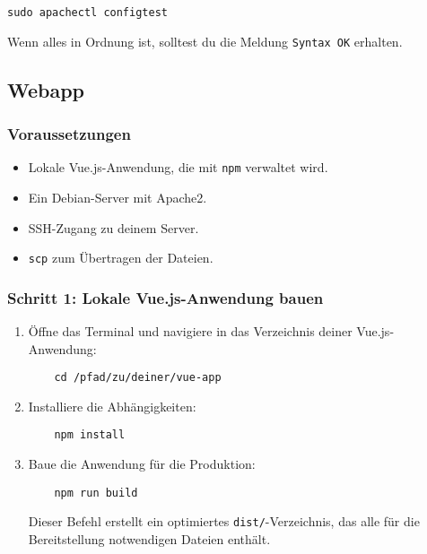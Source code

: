 \documentclass[a4paper,12pt]{article}
\begin{document}
\begin{lstlisting}
sudo apachectl configtest
\end{lstlisting}

Wenn alles in Ordnung ist, solltest du die Meldung \texttt{Syntax OK} erhalten.

\subsection{Webapp}

\subsubsection{Voraussetzungen}
\begin{itemize}
    \item Lokale Vue.js-Anwendung, die mit \texttt{npm} verwaltet wird.
    \item Ein Debian-Server mit Apache2.
    \item SSH-Zugang zu deinem Server.
    \item \texttt{scp} zum Übertragen der Dateien.
\end{itemize}

\subsubsection{Schritt 1: Lokale Vue.js-Anwendung bauen}
\begin{enumerate}
    \item Öffne das Terminal und navigiere in das Verzeichnis deiner Vue.js-Anwendung:
    
    \begin{lstlisting}
    cd /pfad/zu/deiner/vue-app
    \end{lstlisting}
    
    \item Installiere die Abhängigkeiten:

    \begin{lstlisting}
    npm install
    \end{lstlisting}
    
    \item Baue die Anwendung für die Produktion:

    \begin{lstlisting}
    npm run build
    \end{lstlisting}
    
    Dieser Befehl erstellt ein optimiertes \texttt{dist/}-Verzeichnis, das alle für die Bereitstellung notwendigen Dateien enthält.
\end{enumerate}
\end{document}
